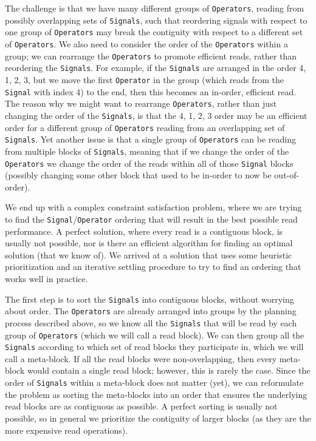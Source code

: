 \documentclass{article}
\begin{document}
The challenge is that we have many different groups of \texttt{Operators}, reading from possibly overlapping sets of \texttt{Signals}, such that reordering signals with respect to one group of \texttt{Operators} may break the contiguity with respect to a different set of \texttt{Operators}.  We also need to consider the order of the \texttt{Operators} within a group; we can rearrange the \texttt{Operators} to promote efficient reads, rather than reordering the \texttt{Signals}.  For example, if the \texttt{Signals} are arranged in the order 4, 1, 2, 3, but we move the first \texttt{Operator} in the group (which reads from the \texttt{Signal} with index 4) to the end, then this becomes an in-order, efficient read.  The reason why we might want to rearrange \texttt{Operators}, rather than just changing the order of the \texttt{Signals}, is that the 4, 1, 2, 3 order may be an efficient order for a different group of \texttt{Operators} reading from an overlapping set of \texttt{Signals}.  Yet another issue is that a single group of \texttt{Operators} can be reading from multiple blocks of \texttt{Signals}, meaning that if we change the order of the \texttt{Operators} we change the order of the reads within all of those \texttt{Signal} blocks (possibly changing some other block that used to be in-order to now be out-of-order).

We end up with a complex constraint satisfaction problem, where we are trying to find the \texttt{Signal}/\texttt{Operator} ordering that will result in the best possible read performance. A perfect solution, where every read is a contiguous block, is usually not possible, nor is there an efficient algorithm for finding an optimal solution (that we know of).  We arrived at a solution that uses some heuristic prioritization and an iterative settling procedure to try to find an ordering that works well in practice.  

The first step is to sort the \texttt{Signals} into contiguous blocks, without worrying about order.  The \texttt{Operators} are already arranged into groups by the planning process described above, so we know all the \texttt{Signals} that will be read by each group of \texttt{Operators} (which we will call a read block).  We can then group all the \texttt{Signals} according to which set of read blocks they participate in, which we will call a meta-block.  If all the read blocks were non-overlapping, then every meta-block would contain a single read block; however, this is rarely the case.  Since the order of \texttt{Signals} within a meta-block does not matter (yet), we can reformulate the problem as sorting the meta-blocks into an order that ensures the underlying read blocks are as contiguous as possible.  A perfect sorting is usually not possible, so in general we prioritize the contiguity of larger blocks (as they are the more expensive read operations).
\end{document}
